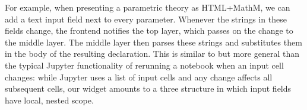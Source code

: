 For example, when presenting a parametric theory as HTML+MathM, we can add a text input field next to every parameter.
Whenever the strings in these fields change, the frontend notifies the top layer, which passes on the change to the middle layer.
The middle layer then parses these strings and substitutes them in the body of the resulting declaration.
This is similar to but more general than the typical Jupyter functionality of rerunning a notebook when an input cell changes: while Jupyter uses a list of input cells and any change affects all subsequent cells, our widget amounts to a three structure in which input fields have local, nested scope.



